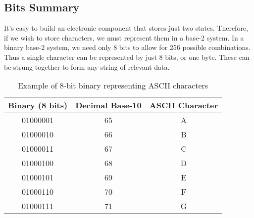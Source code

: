 \documentclass[12pt]{article}
\begin{document}
\subsection*{Bits Summary}

It's easy to build an electronic component that stores just two states. Therefore, if we wish to store characters, we must represent them in a base-2 system. In a binary base-2 system, we need only 8 bits to allow for 256 possible combinations. Thus a single character can be represented by just 8 bits, or one byte. These can be strung together to form any string of relevant data.

\begin{table}[h!]
\centering
\begin{tabular}{|c|c|c|}
\hline
\textbf{Binary (8 bits)} & \textbf{Decimal Base-10} & \textbf{ASCII Character} \\
\hline
01000001 & 65  & A \\
01000010 & 66  & B \\
01000011 & 67  & C \\
01000100 & 68  & D \\
01000101 & 69  & E \\
01000110 & 70  & F \\
01000111 & 71  & G \\
\hline
\end{tabular}
\caption{Example of 8-bit binary representing ASCII characters}
\end{table}
\end{document}
